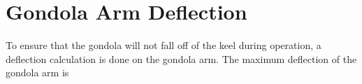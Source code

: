 \documentclass[../main.tex]{subfiles}
\begin{document}
\section{Gondola Arm Deflection}
To ensure that the gondola will not fall off of the keel during operation, a deflection calculation is done on the gondola arm. The maximum deflection of the gondola arm is \cite{curvedDeflection}
\end{document}
